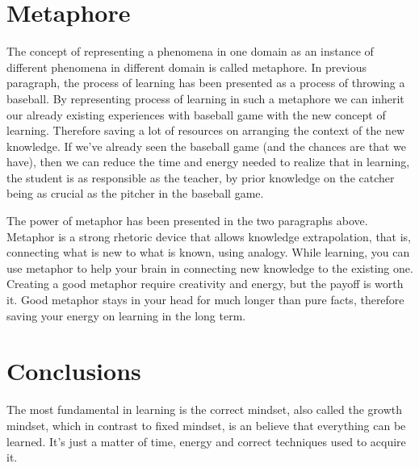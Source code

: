 \documentclass{article}
\begin{document}
\section{Metaphore}
The concept of representing a phenomena in one domain as an instance of different phenomena in different domain is called metaphore. In previous paragraph, the process of learning has been presented as a process of throwing a baseball. By representing process of learning in such a metaphore we can inherit our already existing experiences with baseball game with the new concept of learning. Therefore saving a lot of resources on arranging the context of the new knowledge. If we've already seen the baseball game (and the chances are that we have), then we can reduce the time and energy needed to realize that in learning, the student is as responsible as the teacher, by prior knowledge on the catcher being as crucial as the pitcher in the baseball game.

The power of metaphor has been presented in the two paragraphs above. Metaphor is a strong rhetoric device that allows knowledge extrapolation, that is, connecting what is new to what is known, using analogy. While learning, you can use metaphor to help your brain in connecting new knowledge to the existing one. Creating a good metaphor require creativity and energy, but the payoff is worth it. Good metaphor stays in your head for much longer than pure facts, therefore saving your energy on learning in the long term. 

\section{Conclusions}

The most fundamental in learning is the correct mindset, also called the growth mindset, which in contrast to fixed mindset, is an believe that everything can be learned. It's just a matter of time, energy and correct techniques used to acquire it. 



\end{document}
